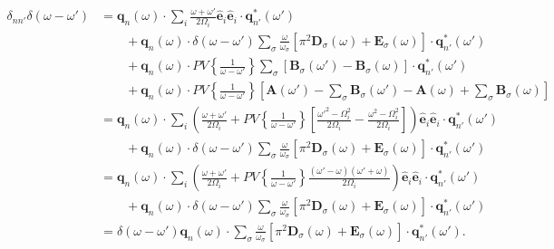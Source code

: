 \begin{equation}
\begin{split}
\delta_{nn'}\delta(\omega - \omega') &= \mathbf{q}_n(\omega)\cdot\sum_{i}\frac{\omega + \omega'}{2\Omega_i}\hat{\mathbf{e}}_i\hat{\mathbf{e}}_i\cdot\mathbf{q}_{n'}^*(\omega')\\
&\qquad + \mathbf{q}_n(\omega)\cdot\delta(\omega - \omega')\sum_\sigma\frac{\omega}{\omega_\sigma}\left[\pi^2\mathbf{D}_\sigma(\omega) + \mathbf{E}_\sigma(\omega)\right]\cdot\mathbf{q}_{n'}^*(\omega')\\
&\qquad + \mathbf{q}_n(\omega)\cdot PV\left\{\frac{1}{\omega - \omega'}\right\}\sum_\sigma\left[\mathbf{B}_\sigma(\omega') - \mathbf{B}_\sigma(\omega)\right]\cdot\mathbf{q}_{n'}^*(\omega')\\
&\qquad + \mathbf{q}_n(\omega)\cdot PV\left\{\frac{1}{\omega - \omega'}\right\}\left[\mathbf{A}(\omega') - \sum_\sigma\mathbf{B}_\sigma(\omega') - \mathbf{A}(\omega) + \sum_\sigma\mathbf{B}_\sigma(\omega)\right]\\
&= \mathbf{q}_n(\omega)\cdot\sum_i\left(\frac{\omega + \omega'}{2\Omega_i} + PV\left\{\frac{1}{\omega - \omega'}\right\}\left[\frac{\omega'^2 - \Omega_i^2}{2\Omega_i} - \frac{\omega^2 - \Omega_i^2}{2\Omega_i}\right]\right)\hat{\mathbf{e}}_i\hat{\mathbf{e}}_i\cdot\mathbf{q}_{n'}^*(\omega')\\
&\qquad + \mathbf{q}_n(\omega)\cdot\delta(\omega - \omega')\sum_\sigma\frac{\omega}{\omega_\sigma}\left[\pi^2\mathbf{D}_\sigma(\omega) + \mathbf{E}_\sigma(\omega)\right]\cdot\mathbf{q}_{n'}^*(\omega')\\
&= \mathbf{q}_n(\omega)\cdot\sum_i\left(\frac{\omega + \omega'}{2\Omega_i} + PV\left\{\frac{1}{\omega - \omega'}\right\}\frac{(\omega' - \omega)(\omega' + \omega)}{2\Omega_i}\right)\hat{\mathbf{e}}_i\hat{\mathbf{e}}_i\cdot\mathbf{q}_{n'}^*(\omega')\\
&\qquad + \mathbf{q}_n(\omega)\cdot\delta(\omega - \omega')\sum_\sigma\frac{\omega}{\omega_\sigma}\left[\pi^2\mathbf{D}_\sigma(\omega) + \mathbf{E}_\sigma(\omega)\right]\cdot\mathbf{q}_{n'}^*(\omega')\\
&= \delta(\omega - \omega')\mathbf{q}_n(\omega)\cdot\sum_\sigma\frac{\omega}{\omega_\sigma}\left[\pi^2\mathbf{D}_\sigma(\omega) + \mathbf{E}_\sigma(\omega)\right]\cdot\mathbf{q}_{n'}^*(\omega').
\end{split}
\end{equation}

